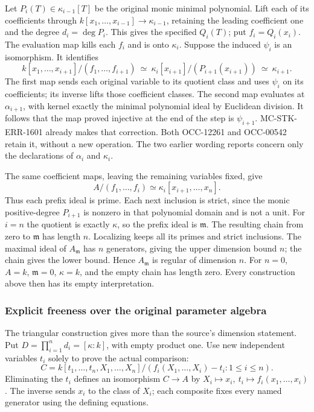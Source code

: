 Let \(P_i(T)\in\kappa_{i-1}[T]\) be the original monic minimal polynomial. Lift each of its coefficients through \(k[x_1,\ldots,x_{i-1}]\to\kappa_{i-1}\), retaining the leading coefficient one and the degree \(d_i=\deg P_i\). This gives the specified \(Q_i(T)\); put \(f_i=Q_i(x_i)\). The evaluation map kills each \(f_i\) and is onto \(\kappa_i\). Suppose the induced \(\psi_i\) is an isomorphism. It identifies \[
 k[x_1,\ldots,x_{i+1}]/(f_1,\ldots,f_{i+1})
 \ \simeq\ \kappa_i[x_{i+1}]/(P_{i+1}(x_{i+1}))
 \ \simeq\ \kappa_{i+1}.
\] The first map sends each original variable to its quotient class and uses \(\psi_i\) on its coefficients; its inverse lifts those coefficient classes. The second map evaluates at \(\alpha_{i+1}\), with kernel exactly the minimal polynomial ideal by Euclidean division. It follows that the map proved injective at the end of the step is \(\psi_{i+1}\). MC-\AlgebraIdentifierBreak{}STK-\AlgebraIdentifierBreak{}ERR-\AlgebraIdentifierBreak{}1601 already makes that correction. Both OCC-12261 and OCC-00542 retain it, without a new operation. The two earlier wording reports concern only the declarations of \(\alpha_i\) and \(\kappa_i\).

The same coefficient maps, leaving the remaining variables fixed, give \[
 A/(f_1,\ldots,f_i)\simeq
 \kappa_i[x_{i+1},\ldots,x_n].
\] Thus each prefix ideal is prime. Each next inclusion is strict, since the monic positive-degree \(P_{i+1}\) is nonzero in that polynomial domain and is not a unit. For \(i=n\) the quotient is exactly \(\kappa\), so the prefix ideal is \(\mathfrak m\). The resulting chain from zero to \(\mathfrak m\) has length \(n\). Localizing keeps all its primes and strict inclusions. The maximal ideal of \(A_{\mathfrak m}\) has \(n\) generators, giving the upper dimension bound \(n\); the chain gives the lower bound. Hence \(A_{\mathfrak m}\) is regular of dimension \(n\). For \(n=0\), \(A=k\), \(\mathfrak m=0\), \(\kappa=k\), and the empty chain has length zero. Every construction above then has its empty interpretation.

\subsubsection{Explicit freeness over the original parameter algebra}\label{algebra-proof-025-explicit-freeness-over-the-original-parameter-algebra}

The triangular construction gives more than the source's dimension statement. Put \(D=\prod_{i=1}^n d_i=[\kappa:k]\), with empty product one. Use new independent variables \(t_i\) solely to prove the actual comparison: \[
 C=k[t_1,\ldots,t_n,X_1,\ldots,X_n]/
       (f_i(X_1,\ldots,X_i)-t_i:1\leq i\leq n).
\] Eliminating the \(t_i\) defines an isomorphism \(C\to A\) by \(X_i\mapsto x_i,\ t_i\mapsto f_i(x_1,\ldots,x_i)\). The inverse sends \(x_i\) to the class of \(X_i\); each composite fixes every named generator using the defining equations.


